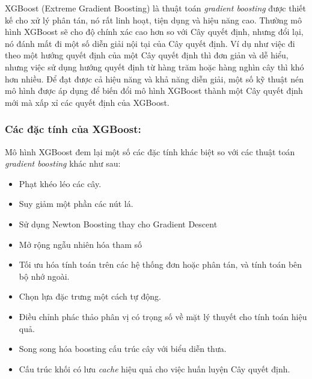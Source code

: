 XGBoost (Extreme Gradient Boosting) là thuật toán \emph{gradient boosting} được thiết kế cho xử lý phân tán, nó rất linh hoạt, tiện dụng và hiệu năng cao. 
Thường mô hình XGBoost sẽ cho độ chính xác cao hơn so với Cây quyết định, nhưng đổi lại, nó đánh mất đi một số diễn giải nội tại của Cây quyết định. 
Ví dụ như việc đi theo một hướng quyết định của một Cây quyết định thì đơn giản và dễ hiểu, nhưng việc sử dụng hướng quyết định từ hàng trăm hoặc hàng nghìn cây thì khó hơn nhiều. Để đạt được cả hiệu năng và khả năng diễn giải, một số kỹ thuật nén mô hình được áp dụng để biến đổi mô hình XGBoost thành một Cây quyết định mới mà xấp xỉ các quyết định của XGBoost.

\subsubsection{Các đặc tính của XGBoost:}
Mô hình XGBoost đem lại một số các đặc tính khác biệt so với các thuật toán \emph{gradient boosting} khác như sau:
\begin{itemize}
    \item Phạt khéo léo các cây.
    \item Suy giảm một phần các nút lá.
    \item Sử dụng Newton Boosting thay cho Gradient Descent
    \item Mở rộng ngẫu nhiên hóa tham số
    \item Tối ưu hóa tính toán trên các hệ thống đơn hoặc phân tán, và tính toán bên bộ nhớ ngoài.
    \item Chọn lựa đặc trưng một cách tự động.
    \item Điều chỉnh phác thảo phân vị có trọng số về mặt lý thuyết cho tính toán hiệu quả.
    \item Song song hóa boosting cấu trúc cây với biểu diễn thưa.
    \item Cấu trúc khối có lưu \emph{cache} hiệu quả cho việc huấn luyện Cây quyết định.
\end{itemize}

